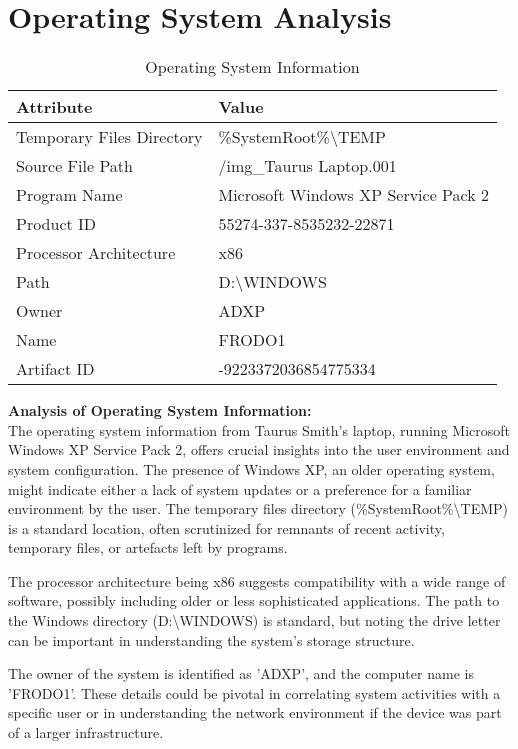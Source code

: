 \section{Operating System Analysis}
\begin{table}[htbp]
\centering
\begin{tabular}{|p{6cm}|p{8cm}|}
\hline
\textbf{Attribute} & \textbf{Value} \\
\hline
Temporary Files Directory & \%SystemRoot\%\textbackslash{}TEMP \\
\hline
Source File Path & /img\_Taurus Laptop.001 \\
\hline
Program Name & Microsoft Windows XP Service Pack 2 \\
\hline
Product ID & 55274-337-8535232-22871 \\
\hline
Processor Architecture & x86 \\
\hline
Path & D:\textbackslash{}WINDOWS \\
\hline
Owner & ADXP \\
\hline
Name & FRODO1 \\
\hline
Artifact ID & -9223372036854775334 \\
\hline
\end{tabular}
\caption{Operating System Information}
\label{table:os-info}
\end{table}

\textbf{Analysis of Operating System Information:}\\
The operating system information from Taurus Smith's laptop, running Microsoft Windows XP Service Pack 2, offers crucial insights into the user environment and system configuration. The presence of Windows XP, an older operating system, might indicate either a lack of system updates or a preference for a familiar environment by the user. The temporary files directory (\%SystemRoot\%\textbackslash{}TEMP) is a standard location, often scrutinized for remnants of recent activity, temporary files, or artefacts left by programs.

The processor architecture being x86 suggests compatibility with a wide range of software, possibly including older or less sophisticated applications. The path to the Windows directory (D:\textbackslash{}WINDOWS) is standard, but noting the drive letter can be important in understanding the system's storage structure.

The owner of the system is identified as 'ADXP', and the computer name is 'FRODO1'. These details could be pivotal in correlating system activities with a specific user or in understanding the network environment if the device was part of a larger infrastructure.

